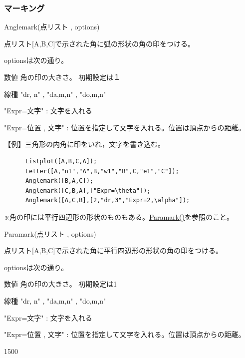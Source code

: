 \documentclass[papersize,a4paper,12pt,uplatex]{jsarticle}
\begin{document}
\subsubsection{マーキング}
\begin{description}

\hypertarget{anglemark}{}
\item[関数]  Anglemark(点リスト , options)
\item[機能]  点リスト[A,B,C]で示された角に弧の形状の角の印をつける。
\item[説明]  optionsは次の通り。

数値      角の印の大きさ。 初期設定は１

線種      "dr, n"  , "da,m,n" , "do,m,n"

"Expr=文字"  : 文字を入れる

"Expr=位置 , 文字"  : 位置を指定して文字を入れる。位置は頂点からの距離。

\vspace{\baselineskip}
【例】三角形の内角に印をいれ，文字を書き込む。
\begin{verbatim}
      Listplot([A,B,C,A]);
      Letter([A,"n1","A",B,"w1","B",C,"e1","C"]);
      Anglemark([B,A,C]);
      Anglemark([C,B,A],["Expr=\theta"]);
      Anglemark([A,C,B],[2,"dr,3","Expr=2,\alpha"]);
\end{verbatim}

\hspace{20mm}

※角の印には平行四辺形の形状のものもある。\hyperlink{paramark}{Paramark()}を参照のこと。

\vspace{\baselineskip}
\hypertarget{paramark}{}
\item[関数]  Paramark(点リスト , options)
\item[機能]  点リスト[A,B,C]で示された角に平行四辺形の形状の角の印をつける。
\item[説明]  optionsは次の通り。

数値  角の印の大きさ。 初期設定は1

線種  "dr, n"  , "da,m,n" , "do,m,n"

"Expr=文字"  : 文字を入れる

"Expr=位置 , 文字"  : 位置を指定して文字を入れる。位置は頂点からの距離。

\begin{layer}{150}{0}
\end{layer}


\end{description}
\end{document}
